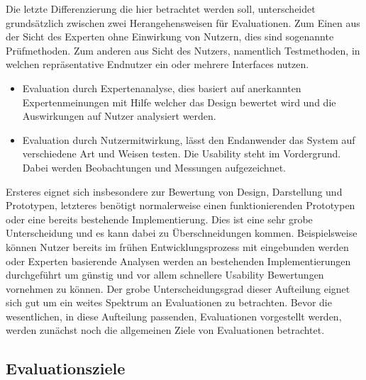 \documentclass[draft=false
              ,paper=a4
              ,twoside=false
              ,fontsize=11pt
              ,headsepline
              ,BCOR10mm
              ,DIV11
              ]{scrbook}
\begin{document}
Die letzte Differenzierung die hier betrachtet werden soll, unterscheidet grundsätzlich zwischen zwei Herangehensweisen für Evaluationen. Zum Einen aus der Sicht des Experten  ohne Einwirkung von Nutzern, dies sind sogenannte Prüfmethoden. Zum anderen aus Sicht des Nutzers, namentlich Testmethoden, in welchen repräsentative Endnutzer ein oder mehrere Interfaces nutzen.
\begin{itemize}
  \item Evaluation durch Expertenanalyse, dies basiert auf anerkannten Expertenmeinungen mit Hilfe welcher das Design bewertet wird und die Auswirkungen auf Nutzer analysiert werden. 
  \item Evaluation durch Nutzermitwirkung, lässt den Endanwender das System auf verschiedene Art und Weisen testen. Die Usability steht im Vordergrund. Dabei werden Beobachtungen und Messungen aufgezeichnet.
\end{itemize}
Ersteres eignet sich insbesondere zur Bewertung von Design, Darstellung und Prototypen, letzteres benötigt normalerweise einen funktionierenden Prototypen oder eine bereits bestehende Implementierung. Dies ist eine sehr grobe Unterscheidung und es kann dabei zu Überschneidungen kommen. Beispielsweise können Nutzer bereits im frühen Entwicklungsprozess mit eingebunden werden oder Experten basierende Analysen werden an bestehenden Implementierungen durchgeführt um günstig und vor allem schnellere Usability Bewertungen vornehmen zu können. Der grobe Unterscheidungsgrad dieser Aufteilung eignet sich gut um ein weites Spektrum an Evaluationen zu betrachten. Bevor die wesentlichen, in diese Aufteilung passenden, Evaluationen vorgestellt werden, werden zunächst noch die allgemeinen Ziele von Evaluationen betrachtet.

\subsection{Evaluationsziele} %
\label{sub:evaluationsziele}
\end{document}
